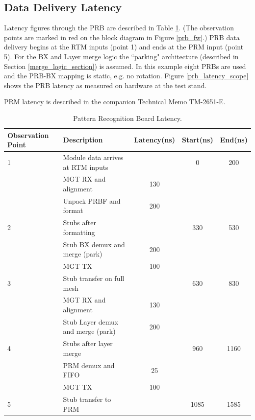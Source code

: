 \documentclass[letterpaper]{article}
\begin{document}
\subsection{Data Delivery Latency}
\label{section_latency}

Latency figures through the PRB are described in Table \ref{data_delivery_latency_table}.  (The observation points are marked in red on the block diagram in Figure \ref{prb_fw}.)  PRB data delivery begins at the RTM inputs (point 1) and ends at the PRM input (point 5).  For the BX and Layer merge logic the ``parking" architecture (described in Section \ref{merge_logic_section}) is assumed.  In this example eight PRBs are used and the PRB-BX mapping is static, e.g. no rotation.  Figure \ref{prb_latency_scope} shows the PRB latency as measured on hardware at the test stand.

PRM latency is described in the companion Technical Memo TM-2651-E\cite{tm2651e}.  

\begin{table}
\centering
\caption{Pattern Recognition Board Latency.}
\label{data_delivery_latency_table}
\begin{tabular}{|l|l|c|c|c|} \hline
Observation Point & Description                       & Latency(ns) & Start(ns)  & End(ns) \\ \hline
1                 & Module data arrives at RTM inputs &             & 0          & 200     \\ \hline
                  & MGT RX and alignment              & 130         &            &         \\ \hline
                  & Unpack PRBF and format            & 200         &            &         \\ \hline
2                 & Stubs after formatting            &             & 330        & 530     \\ \hline
                  & Stub BX demux and merge (park)    & 200         &            &         \\ \hline
                  & MGT TX                            & 100         &            &         \\ \hline
3                 & Stub transfer on full mesh        &             & 630        & 830     \\ \hline
                  & MGT RX and alignment              & 130         &            &         \\ \hline
                  & Stub Layer demux and merge (park) & 200         &            &         \\ \hline
4                 & Stubs after layer merge           &             & 960        & 1160    \\ \hline
                  & PRM demux and FIFO                & 25          &            &         \\ \hline
                  & MGT TX                            & 100         &            &         \\ \hline
5                 & Stub transfer to PRM              &             & 1085       & 1585    \\ \hline
\end{tabular}
\end{table}
\end{document}
